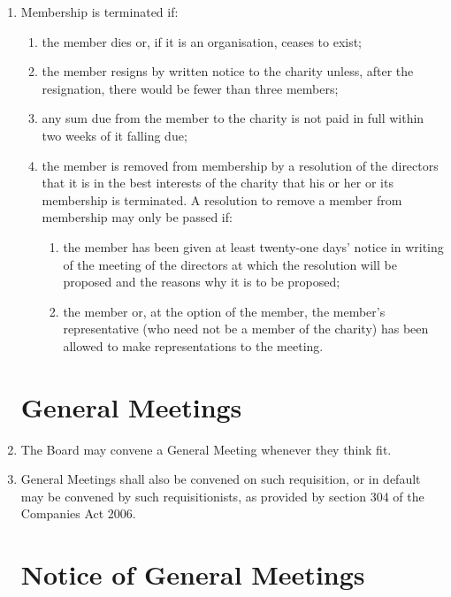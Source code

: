 \begin{enumerate}
\item
  Membership is terminated if:
  \begin{enumerate}
  \item
    the member dies or, if it is an organisation, ceases to exist;
  \item
    the member resigns by written notice to the charity unless, after
    the resignation, there would be fewer than three members;
  \item
    any sum due from the member to the charity is not paid in full
    within two weeks of it falling due;
  \item
    the member is removed from membership by a resolution of the
    directors that it is in the best interests of the charity that his
    or her or its membership is terminated. A resolution to remove a
    member from membership may only be passed if:
    \begin{enumerate}
    \item
      the member has been given at least twenty-one days' notice in
      writing of the meeting of the directors at which the resolution
      will be proposed and the reasons why it is to be proposed;
    \item
      the member or, at the option of the member, the member's
      representative (who need not be a member of the charity) has been
      allowed to make representations to the meeting.
    \end{enumerate}
  \end{enumerate}

\section{General Meetings}
\item
    The Board may convene a General Meeting whenever they think fit. 

\item 
    General Meetings shall also be convened on such requisition, or in default may be convened by such
    requisitionists, as provided by section 304 of the Companies Act 2006.

\section{Notice of General Meetings}


\end{enumerate}
